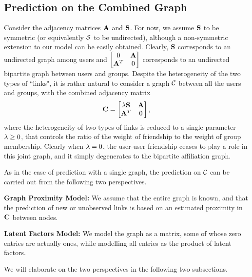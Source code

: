 \subsection{Prediction on the Combined Graph}
Consider the adjacency matrices $\mathbf{A}$ and $\mathbf{S}$. For now, we assume $\mathbf{S}$ to be symmetric (or equivalently $\mathcal{S}$ to be undirected), although a non-symmetric extension to our model can be easily obtained. Clearly, $\mathbf{S}$ corresponds to an undirected graph among users and $\begin{bmatrix}
 0 & \mathbf{A} \\
\mathbf{A}^T & 0
\end{bmatrix}$
corresponds to an undirected bipartite graph between users and groups. Despite the heterogeneity of the two types of ``links", it is rather natural to consider a graph $\mathcal{C}$ between all the users and groups, with the combined adjacency matrix
\begin{equation}
\mathbf{C} =
\begin{bmatrix}
\lambda \mathbf{S} & \mathbf{A} \\
\mathbf{A}^T & 0
\end{bmatrix},
\label{e:C}
\end{equation}
where the heterogeneity of two types of links is reduced to a single parameter $\lambda \geq 0$, that controls the ratio of the weight of friendship to the weight of group membership. Clearly when $\lambda = 0$, the user-user friendship ceases to play a role in this joint graph, and it simply degenerates to the bipartite affiliation graph.

As in the case of prediction with a single graph, the prediction on $\mathcal{C}$ can be carried out from the following two perspectives.
\begin{compactenum}
\item \textbf{Graph Proximity Model:} We assume that the entire graph is known, and that the prediction of new or unobserved links is based on an estimated proximity in $\mathbf{C}$ between nodes.
\item \textbf{Latent Factors Model:} We model the graph as a matrix, some of whose zero entries are actually ones, while modelling all entries as the product of latent factors.
\end{compactenum}
We will elaborate on the two perspectives in the following two subsections.

